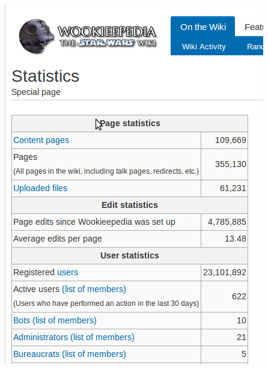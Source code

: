 \documentclass{beamer}
\begin{document}
\begin{frame}
\begin{columns}
\begin{column}{0.5\textwidth}
      \includegraphics[height = 0.8\textheight, width = \textwidth, keepaspectratio = true]{figure/wookie_stats}
    \end{column}
  \end{columns}
\end{frame}
\end{document}
